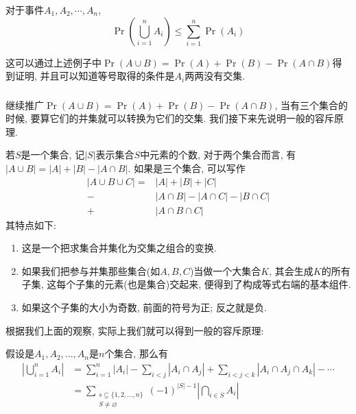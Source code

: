 \documentclass{ctexart}
\begin{document}
\subsubsection{}  

\begin{proposition}
    对于事件$A_1, A_2, \cdots, A_n$, 
    $$
\operatorname{Pr}\left(\bigcup_{i=1}^n A_i\right) \leq \sum_{i=1}^n \operatorname{Pr}\left(A_i\right)
$$
\end{proposition}

这可以通过上述例子中$\Pr(A\cup B)=\Pr(A)+\Pr(B)-\Pr(A\cap B)$得到证明, 并且可以知道等号取得的条件是$A_i$两两没有交集. 

\subsubsection{} 继续推广$\operatorname{Pr}(A \cup B)=\operatorname{Pr}(A)+\operatorname{Pr}(B)-\operatorname{Pr}(A \cap B)$, 当有三个集合的时候, 要算它们的并集就可以转换为它们的交集. 我们接下来先说明一般的容斥原理. 

若$S$是一个集合, 记$|S|$表示集合$S$中元素的个数, 对于两个集合而言, 有$|A \cup B|=|A|+|B|-|A \cap B|.$ 如果是三个集合, 可以写作
$$
\begin{aligned}
|A \cup B \cup C| =& |A|+|B|+|C| \\
-&|A \cap B|-|A \cap C|-|B \cap C| \\
+&|A \cap B \cap C| 
\end{aligned}
$$
其特点如下: 
\begin{enumerate}
    \item 这是一个把求集合并集化为交集之组合的变换. 
    \item 如果我们把参与并集那些集合(如$A,B,C$)当做一个大集合$K$, 其会生成$K$的所有子集, 这每个子集的元素(也是集合)交起来, 便得到了构成等式右端的基本组件.
    \item 如果这个子集的大小为奇数, 前面的符号为正; 反之就是负. 

\end{enumerate}

根据我们上面的观察, 实际上我们就可以得到一般的容斥原理: 

\begin{theorem}[容斥原理]
    假设是$A_1, A_2, ... , A_n$是$n$个集合, 那么有
    $$
\begin{aligned}
\left|\bigcup_{i=1}^n A_i\right| & =\sum_{i=1}^n \left|A_i\right|-\sum_{i<j} \left|A_i \cap A_j\right|+\sum_{i<j<k} \left|A_i \cap A_j \cap A_k\right|-\cdots \\
& =\sum_{\substack{s \subseteq\{1,2, \ldots, n\} \\
S \neq \varnothing}}(-1)^{|S|-1} \left|\bigcap_{i \in S} A_i\right|
\end{aligned}
$$
\end{theorem}
\end{document}
